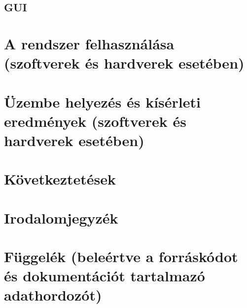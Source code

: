 \documentclass[a4paper, 11pt]{article}
\begin{document}
\subsection{GUI}\label{subsec:gui}

\section{A rendszer felhasználása (szoftverek és hardverek esetében)}\label{sec:useage}

\section{Üzembe helyezés és kísérleti eredmények (szoftverek és hardverek esetében)}\label{sec:testcases}

\section{Következtetések}\label{sec:conc}

\section{Irodalomjegyzék}\label{sec:irod}

\section{Függelék (beleértve a forráskódot és dokumentációt tartalmazó adathordozót)}\label{sec:dep}
\end{document}
